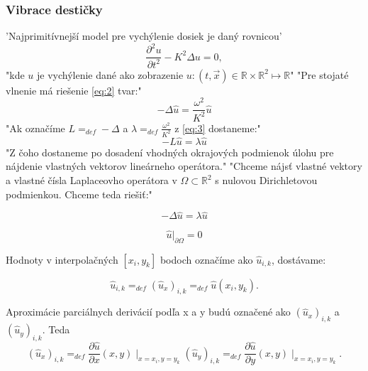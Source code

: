 \documentclass{beamer}
\begin{document}
\begin{frame}
	\frametitle{Vibrace destičky}
	
	{\tiny'Najprimitívnejší model pre vychýlenie dosiek je daný rovnicou'
	\begin{equation}
		\label{eq:2}
		\frac{\partial ^2{u}}{\partial {t^{2}}}-K^{2}\Delta{u}=0,
	\end{equation}
	"kde $u$ je vychýlenie dané ako zobrazenie $u:(t,\vec{x}) \in \mathbb{R} \times \mathbb{R}^{2} \mapsto \mathbb{R}$"
	"Pre stojaté vlnenie má riešenie \eqref{eq:2} tvar:"
	\begin{equation}
		\label{eq:3}
		-\Delta{\widehat{u}}=\frac{\omega^{2}}{K^{2}}\widehat{u}
	\end{equation}
	"Ak označíme $L=_{def}-\Delta$ a $\lambda=_{def}\frac{\omega^{2}}{K^{2}}$ z \ref{eq:3} dostaneme:"
	\begin{equation}
		\label{eq:4}
		-L{\widehat{u}}=\lambda\widehat{u}
	\end{equation}
	"Z čoho dostaneme po dosadení vhodných okrajových podmienok úlohu pre nájdenie vlastných vektorov lineárneho operátora."
		"Chceme nájsť vlastné vektory a vlastné čísla Laplaceovho operátora v $\Omega \subset \mathbb{R}^{2}$ s nulovou Dirichletovou podmienkou. Chceme teda riešiť:"
	
	\begin{subeqations}
		\label{eq:5}
		\begin{equation}
			\label{eq:6}
			-\Delta{\widehat{u}}=\lambda\widehat{u}
		\end{equation}
		
		\begin{equation}
			\label{eq:7}
			\widehat{u}|_{\partial{\Omega}}=0
		\end{equation}
		
	\end{subeqations}
	Hodnoty  v interpolačných $[x_{i},y_{k}]$ bodoch označíme ako $\widehat{u}_{i,k}$, dostávame:
	
	\begin{equation}
		\label{eq:8}
		\widehat{u}_{i,k}=_{def}(\widehat{u}_{x})_{i,k}=_{def}\widehat{u}(x_i,y_k).
	\end{equation}
	
	Aproximácie parciálnych derivácií podľa x a y budú označené ako $(\widehat{u}_{x})_{i,k}$ a $(\widehat{u}_{y})_{i,k}$. Teda
	\begin{subequations}
		\label{eq:9}
		\begin{equation}
			\label{eq:10}
			(\widehat{u}_{x})_{i,k}=_{def}\frac{\partial \widehat{u} }{\partial x}(x,y)\mid_{x=x_i,y=y_k}
		\end{equation}
		\begin{equation}
			\label{eq:11}
			(\widehat{u}_{y})_{i,k}=_{def}\frac{\partial \widehat{u} }{\partial y}(x,y)\mid_{x=x_i,y=y_k}.
		\end{equation}
	\end{subequations}
	}
\end{frame}
\end{document}
